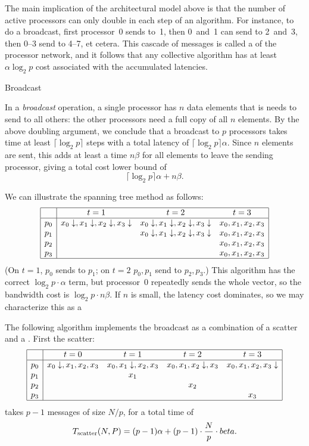 The main implication of the architectural model above is that the
number of active processors can only double in each step of an
algorithm. For instance, to do a broadcast, first processor~0 sends
to~1, then 0~and~1 can send to 2~and~3, then 0--3 send to 4--7, et
cetera. This cascade of messages is called
a  of the processor network, and
it follows that any collective algorithm has at least $\alpha\log_2p$
cost associated with the accumulated latencies.

 {Broadcast}

In a \emph{broadcast} operation, a single processor has $n$ data elements
that is needs to send to all others: the other processors need a full
copy of all $n$ elements.  By
the above doubling argument, we conclude that a broadcast to $p$
processors takes time at least $\lceil\log_2 p\rceil$ steps with a
total latency of $\lceil\log_2 p\rceil \alpha$. Since $n$ elements are
sent, this adds at least a time $n\beta$ for all elements to leave the
sending processor, giving a total cost lower bound of
\[ \lceil\log_2 p\rceil \alpha+n\beta. \]

We can illustrate the spanning tree method as follows:
\[
\begin{array}{|c|ccc|}
\hline
  &t=1&t=2&t=3\\ \hline
p_0&x_0\downarrow,x_1\downarrow,x_2\downarrow,x_3\downarrow
   &x_0\downarrow,x_1\downarrow,x_2\downarrow,x_3\downarrow
   &x_0,x_1,x_2,x_3\\
p_1&&x_0\downarrow,x_1\downarrow,x_2\downarrow,x_3\downarrow
   &x_0,x_1,x_2,x_3\\
p_2&&&x_0,x_1,x_2,x_3\\
p_3&&&x_0,x_1,x_2,x_3\\
\hline
\end{array}
\]
(On $t=1$, $p_0$ sends to $p_1$; on $t=2$ $p_0,p_1$ send to $p_2,p_3$.)
This algorithm has the correct $\log_2p\cdot\alpha$ term, but processor~0 repeatedly
sends the whole vector, so the bandwidth cost is $\log_2p\cdot n\beta$.
If $n$ is small, the latency cost dominates, so we may characterize this 
as a 

The following algorithm implements the broadcast as a combination of a scatter
and a . First the scatter:
\[
\begin{array}{|c|cccc|}
\hline
  &t=0&t=1&t=2&t=3\\ \hline
  p_0&x_0\downarrow,x_1,x_2,x_3 %
  &x_0,x_1\downarrow,x_2,x_3 %
   &x_0,x_1,x_2\downarrow,x_3 %
  &x_0,x_1,x_2,x_3\downarrow %
  \\
  p_1& %
  &x_1&&\\
  p_2&& %
  &x_2&\\
  p_3&&& %
  &x_3\\
\hline
\end{array}
\]
takes $p-1$ messages of size $N/p$, for a total time of
\[ T_{\scriptsize\mathrm{scatter}}(N,P) = (p-1)\alpha +
(p-1)\cdot\frac{N}{p}\cdot beta.
\]

